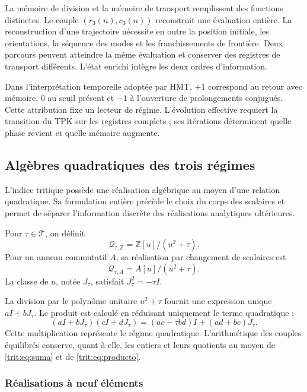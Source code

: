 La mémoire de division et la mémoire de transport remplissent des fonctions
distinctes. Le couple \((r_3(n),c_3(n))\) reconstruit une évaluation entière.
La reconstruction d'une trajectoire nécessite en outre la position initiale,
les orientations, la séquence des modes et les franchissements de frontière. Deux parcours
peuvent atteindre la même évaluation et conserver des registres de transport
différents. L'état enrichi intègre les deux ordres d'information.

Dans l'interprétation temporelle adoptée par HMT, \(+1\) correspond au
retour avec mémoire, \(0\) au seuil présent et \(-1\) à l'ouverture de
prolongements conjugués. Cette attribution fixe un lecteur de régime.
L'évolution effective requiert la transition du TPK sur les registres
complets ; ses itérations déterminent quelle phase revient et quelle mémoire
augmente.

\subsection{Algèbres quadratiques des trois régimes}
\label{trit:cuadraticas}

L'indice tritique possède une réalisation algébrique au moyen d'une relation
quadratique. Sa formulation entière précède le choix du corps des
scalaires et permet de séparer l'information discrète des réalisations
analytiques ultérieures.

\begin{definicion}
Pour \(\tau\in\mathcal T\), on définit
\[
 \mathcal Q_{\tau,\mathbb Z}=\mathbb Z[u]/(u^2+\tau).
\]
Pour un anneau commutatif \(A\), sa réalisation par changement de scalaires est
\[
 \mathcal Q_{\tau,A}=A[u]/(u^2+\tau).
\]
La classe de \(u\), notée \(J_\tau\), satisfait
\(J_\tau^2=-\tau I\).
\end{definicion}

La division par le polynôme unitaire \(u^2+\tau\) fournit une expression
unique \(aI+bJ_\tau\). Le produit est calculé en réduisant uniquement le
terme quadratique :
\begin{equation}
 (aI+bJ_\tau)(cI+dJ_\tau)
 =(ac-\tau bd)I+(ad+bc)J_\tau.
\label{trit:eq:producto-cuadratico}
\end{equation}
Cette multiplication représente le régime quadratique. L'arithmétique des
couples équilibrés conserve, quant à elle, les entiers et leurs quotients
au moyen de \eqref{trit:eq:suma} et de \eqref{trit:eq:producto}.

\subsubsection{Réalisations à neuf éléments}

